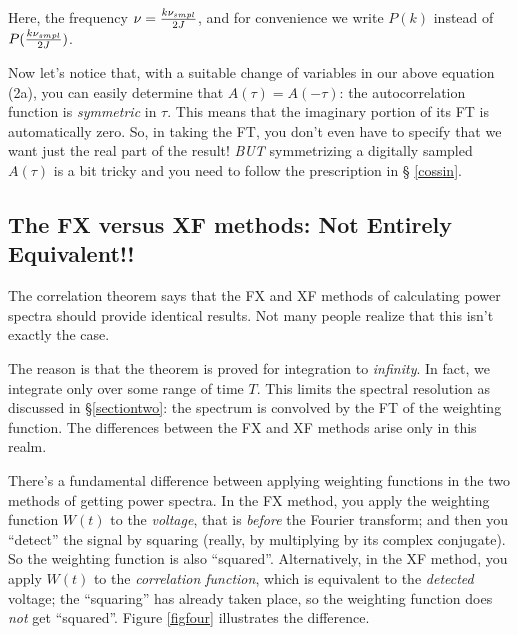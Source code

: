 \documentclass[11pt,preprint]{aastex}
\begin{document}
\noindent Here, the frequency $\nu = {k \nu_{smpl} \over 2J}$, and for
convenience we write $P(k)$ instead of $P({k \nu_{smpl} \over 2J})$.

        Now let's notice that, with a suitable change of variables in
our above equation (2a), you can easily determine that $A(\tau) =
A(-\tau)$: the autocorrelation function is {\it symmetric} in $\tau$.
This means that the imaginary portion of its FT is automatically zero.
So, in taking the FT, you don't even have to specify that we want just
the real part of the result! {\it BUT} symmetrizing a digitally sampled
$A(\tau)$ is a bit tricky and you need to follow the prescription in \S
\ref{cossin}.

\subsection{The FX versus XF methods: Not Entirely Equivalent!!}

	The correlation theorem says that the FX and XF methods of
calculating power spectra should provide identical results. Not many
people realize that this isn't exactly the case.

	The reason is that the theorem is proved for integration to
{\it infinity}. In fact, we integrate only over some range of time $T$.
This limits the spectral resolution as discussed in \S \ref{sectiontwo}:
the spectrum is convolved by the FT of the weighting function. The
differences between the FX and XF methods arise only in this realm.

        There's a fundamental difference between applying weighting
functions in the two methods of getting power spectra.  In the FX
method, you apply the weighting function $W(t)$ to the {\it voltage},
that is {\it before} the Fourier transform; and then you ``detect'' the
signal by squaring (really, by multiplying by its complex conjugate). 
So the weighting function is also ``squared''. Alternatively, in the XF
method, you apply $W(t)$ to the {\it correlation function}, which is
equivalent to the {\it detected} voltage; the ``squaring'' has already
taken place, so the weighting function does {\it not} get ``squared''. 
Figure \ref{figfour} illustrates the difference.
\end{document}

